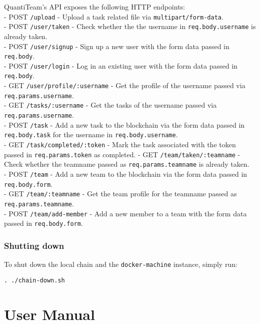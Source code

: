 QuantiTeam's API exposes the following HTTP endpoints:\\
- POST
\texttt{/upload} - Upload a task related file via
\texttt{multipart/form-data}.\\
- POST \texttt{/user/taken} - Check whether the the username in
\texttt{req.body.username} is already taken.\\
- POST \texttt{/user/signup} - Sign up a new user with the form data
passed in \texttt{req.body}.\\
- POST \texttt{/user/login} - Log in an existing user with the form data
passed in \texttt{req.body}.\\
- GET \texttt{/user/profile/:username} - Get the profile of the username
passed via \texttt{req.params.username}.\\
- GET \texttt{/tasks/:username} - Get the tasks of the username passed
via \texttt{req.params.username}.\\
- POST \texttt{/task} - Add a new task to the blockchain via the form
data passed in \texttt{req.body.task} for the username in
\texttt{req.body.username}.\\
- GET \texttt{/task/completed/:token} - Mark the task associated with
the token passed in \texttt{req.params.token} as completed. - GET
\texttt{/team/taken/:teamname} - Check whether the teamname passed as
\texttt{req.params.teamname} is already taken.\\
- POST \texttt{/team} - Add a new team to the blockchain via the form
data passed in \texttt{req.body.form}.\\
- GET \texttt{/team/:teamname} - Get the team profile for the teamname
passed as \texttt{req.params.teamname}.\\
- POST \texttt{/team/add-member} - Add a new member to a team with the
form data passed in \texttt{req.body.form}.

\subsection{Shutting down}\label{shutting-down}

To shut down the local chain and the \texttt{docker-machine} instance,
simply run:

\begin{verbatim}
. ./chain-down.sh
\end{verbatim}


\chapter{User Manual}

